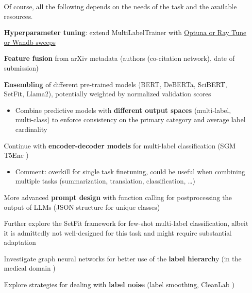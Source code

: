 \documentclass[11pt,letterpaper]{article}
\begin{document}
Of course, all the following depends on the needs of the task and the available resources.
\small 
\begin{todolist}
  \item \textbf{Hyperparameter tuning}: extend MultiLabelTrainer with \href{https://huggingface.co/docs/transformers/en/hpo_train}{Optuna or Ray Tune or Wandb sweeps}
  \item \textbf{Feature fusion} from arXiv metadata (\eg authors (co-citation network), date of submission)
  \item \textbf{Ensembling} of different pre-trained models (\eg BERT, DeBERTa, SciBERT, SetFit, Llama2), potentially weighted by normalized validation scores
  \begin{itemize}
    \item Combine predictive models with \textbf{different output spaces} (\eg multi-label, multi-class) to enforce consistency on the primary category and average label cardinality 
  \end{itemize}
  \item Continue with \textbf{encoder-decoder models} for multi-label classification (\eg SGM \cite{syang2018sgm} T5Enc \cite{kementchedjhieva2023exploration})
  \begin{itemize}
    \item Comment: overkill for single task finetuning, could be useful when combining multiple tasks (summarization, translation, classification, \ldots)
  \end{itemize}
  \item More advanced \textbf{prompt design} with function calling for postprocessing the output of LLMs (\eg JSON structure for unique classes)
  \item Further explore the SetFit framework for few-shot multi-label classification, albeit it is admittedly not well-designed for this task and might require substantial adaptation
  \item Investigate graph neural networks for better use of the \textbf{label hierarch}y (\eg in the medical domain \cite{chi2024graph})
  \item Explore strategies for dealing with \textbf{label noise} (\eg label smoothing, CleanLab \cite{kumar2020robust,oyen2022robustness})
\end{todolist}

{\small


}
\end{document}
